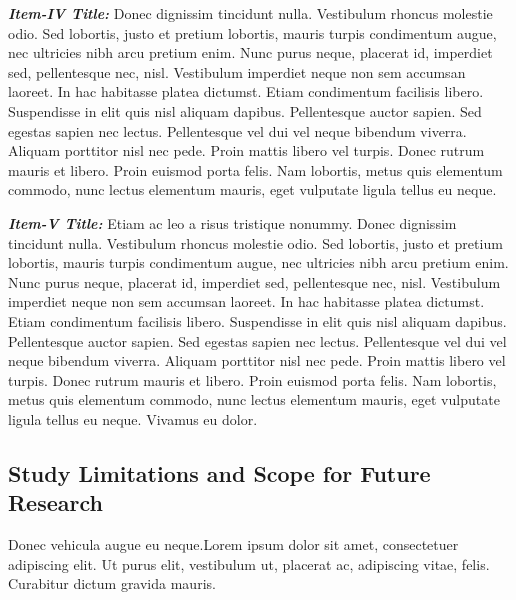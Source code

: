 \documentclass{article}
\begin{document}
\noindent
\textbf{\textit{Item-IV Title:}} Donec dignissim tincidunt nulla. Vestibulum rhoncus molestie odio. Sed lobortis, justo et pretium lobortis, mauris turpis condimentum augue, nec ultricies nibh arcu pretium enim. Nunc purus neque, placerat id, imperdiet sed, pellentesque nec, nisl. Vestibulum imperdiet neque non sem accumsan laoreet. In hac habitasse platea dictumst. Etiam condimentum facilisis libero. Suspendisse in elit quis nisl aliquam dapibus. Pellentesque auctor sapien. Sed egestas sapien nec lectus. Pellentesque vel dui vel neque bibendum viverra. Aliquam porttitor nisl nec pede.
Proin mattis libero vel turpis. Donec rutrum mauris et libero. Proin euismod porta felis. Nam lobortis, metus quis elementum commodo, nunc lectus elementum mauris, eget vulputate ligula tellus eu neque.
\vspace{2mm}

\noindent
\textbf{\textit{Item-V Title:}} Etiam ac leo a risus tristique nonummy. Donec dignissim tincidunt nulla. Vestibulum rhoncus molestie odio. Sed lobortis, justo et pretium lobortis, mauris turpis condimentum augue, nec ultricies nibh arcu pretium enim. Nunc purus neque, placerat id, imperdiet sed, pellentesque nec, nisl. Vestibulum imperdiet neque non sem accumsan laoreet. In hac habitasse platea dictumst. Etiam condimentum facilisis libero. Suspendisse in elit quis nisl aliquam dapibus. Pellentesque auctor sapien. Sed egestas sapien nec lectus. Pellentesque vel dui vel neque bibendum viverra. Aliquam porttitor nisl nec pede.
Proin mattis libero vel turpis. Donec rutrum mauris et libero. Proin euismod porta felis. Nam lobortis, metus quis elementum commodo, nunc lectus elementum mauris, eget vulputate ligula tellus eu neque. Vivamus eu dolor.


\subsection{Study Limitations and Scope for Future Research}
Donec vehicula augue eu neque.Lorem ipsum dolor sit amet, consectetuer adipiscing elit. Ut purus elit, vestibulum ut, placerat ac, adipiscing vitae, felis. Curabitur dictum gravida mauris.
\end{document}

